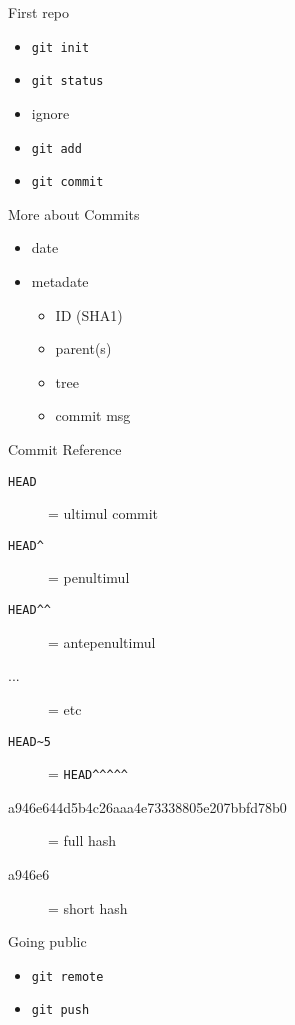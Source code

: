 \documentclass{beamer}
\begin{document}
\begin{frame}{First repo}
  \begin{itemize}
    \item \texttt{git init}
    \item \texttt{git status}
    \item ignore %
    \item \texttt{git add}
    \item \texttt{git commit}
  \end{itemize}
\end{frame}

\begin{frame}{More about Commits}
  \begin{itemize}
    \item date
    \item metadate
    \pause
    \begin{itemize}
      \item ID (SHA1)
      \item parent(s)
      \item tree
      \item commit msg
    \end{itemize}
  \end{itemize}
\end{frame}

\begin{frame}{Commit Reference}
  \begin{description}
    \item[\texttt{HEAD}] = ultimul commit
    \item[\texttt{HEAD\textasciicircum}] = penultimul
    \item[\texttt{HEAD\textasciicircum\textasciicircum}] = antepenultimul
    \item[...] = etc
    \pause
    \item[\texttt{HEAD\textasciitilde5}] = \texttt{HEAD\textasciicircum\textasciicircum\textasciicircum\textasciicircum\textasciicircum}
    \pause
    \item[a946e644d5b4c26aaa4e73338805e207bbfd78b0] = full hash
    \item[a946e6] = short hash
  \end{description}
\end{frame}

\begin{frame}{Going public}
  \begin{itemize}
    \item \texttt{git remote}
    \item \texttt{git push}
  \end{itemize}
\end{frame}
\end{document}
